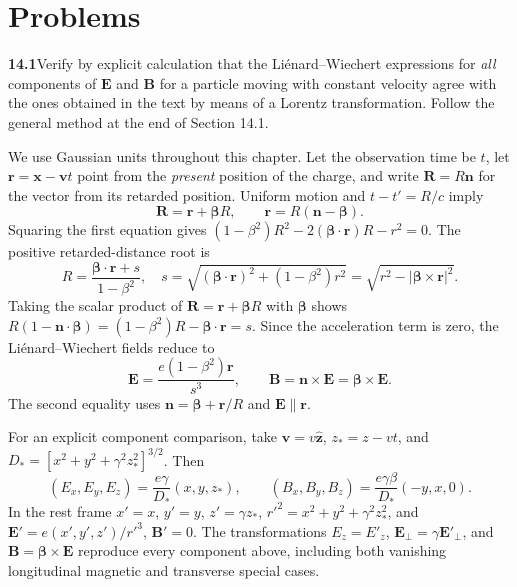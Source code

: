 
\section*{Problems}

\par\bigskip
\noindent\textbf{14.1}\quad Verify by explicit calculation that the Li\'enard--Wiechert expressions for \emph{all} components of $\mathbf{E}$ and $\mathbf{B}$ for a particle moving with constant velocity agree with the ones obtained in the text by means of a Lorentz transformation. Follow the general method at the end of Section 14.1.
\solution

We use Gaussian units throughout this chapter. Let the observation time be
$t$, let $\mathbf r=\mathbf x-\mathbf v t$ point from the \emph{present}
position of the charge, and write $\mathbf R=R\mathbf n$ for the vector
from its retarded position. Uniform motion and $t-t'=R/c$ imply
\[
\mathbf R=\mathbf r+\boldsymbol\beta R,\qquad
\mathbf r=R(\mathbf n-\boldsymbol\beta).
\]
Squaring the first equation gives
$(1-\beta^2)R^2-2(\boldsymbol\beta\cdot\mathbf r)R-r^2=0$.
The positive retarded-distance root is
\[
R=\frac{\boldsymbol\beta\cdot\mathbf r+s}{1-\beta^2},\quad
s=\sqrt{(\boldsymbol\beta\cdot\mathbf r)^2+(1-\beta^2)r^2}
=\sqrt{r^2-|\boldsymbol\beta\times\mathbf r|^2}.
\]
Taking the scalar product of $\mathbf R=\mathbf r+\boldsymbol\beta R$
with $\boldsymbol\beta$ shows
$R(1-\mathbf n\cdot\boldsymbol\beta)
=(1-\beta^2)R-\boldsymbol\beta\cdot\mathbf r=s$.
Since the acceleration term is zero, the Li\'enard--Wiechert fields reduce to
\[
\boxed{\mathbf E=\frac{e(1-\beta^2)\mathbf r}{s^3},\qquad
\mathbf B=\mathbf n\times\mathbf E
=\boldsymbol\beta\times\mathbf E.}
\]
The second equality uses $\mathbf n=\boldsymbol\beta+\mathbf r/R$ and
$\mathbf E\parallel\mathbf r$.

For an explicit component comparison, take $\mathbf v=v\hat{\mathbf z}$,
$z_*=z-vt$, and $D_*=[x^2+y^2+\gamma^2z_*^2]^{3/2}$. Then
\[
(E_x,E_y,E_z)=\frac{e\gamma}{D_*}(x,y,z_*),\qquad
(B_x,B_y,B_z)=\frac{e\gamma\beta}{D_*}(-y,x,0).
\]
In the rest frame $x'=x$, $y'=y$, $z'=\gamma z_*$,
$r'^2=x^2+y^2+\gamma^2z_*^2$, and
$\mathbf E'=e(x',y',z')/r'^3$, $\mathbf B'=0$.
The transformations $E_z=E'_z$, $\mathbf E_\perp=\gamma\mathbf E'_\perp$,
and $\mathbf B=\boldsymbol\beta\times\mathbf E$ reproduce every component
above, including both vanishing longitudinal magnetic and transverse
special cases.

